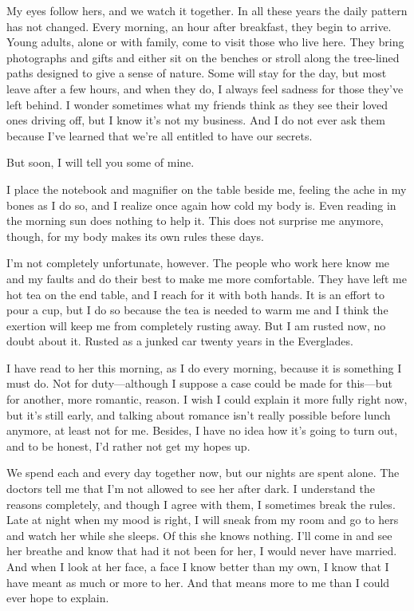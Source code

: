 \documentclass[10pt, twoside, openright]{book}
\begin{document}
My eyes follow hers, and we watch it together. In all these years the
daily pattern has not changed. Every morning, an hour after breakfast,
they begin to arrive. Young adults, alone or with family, come to visit
those who live here. They bring photographs and gifts and either sit on
the benches or stroll along the tree-lined paths designed to give a
sense of nature. Some will stay for the day, but most leave after a few
hours, and when they do, I always feel sadness for those they've left
behind. I wonder sometimes what my friends think as they see their loved
ones driving off, but I know it's not my business. And I do not ever ask
them because I've learned that we're all entitled to have our secrets.


But soon, I will tell you some of mine.


I place the notebook and magnifier on the table beside me, feeling the
ache in my bones as I do so, and I realize once again how cold my body
is. Even reading in the morning sun does nothing to help it. This does
not surprise me anymore, though, for my body makes its own rules these
days.

I'm not completely unfortunate, however. The people who work here know
me and my faults and do their best to make me more comfortable. They
have left me hot tea on the end table, and I reach for it with both
hands. It is an effort to pour a cup, but I do so because the tea is
needed to warm me and I think the exertion will keep me from completely
rusting away. But I am rusted now, no doubt about it. Rusted as a junked
car twenty years in the Everglades.

I have read to her this morning, as I do every morning, because it is
something I must do. Not for duty---although I suppose a case could be
made for this---but for another, more romantic, reason. I wish I could
explain it more fully right now, but it's still early, and talking about
romance isn't really possible before lunch anymore, at least not for me.
Besides, I have no idea how it's going to turn out, and to be honest,
I'd rather not get my hopes up.

We spend each and every day together now, but our nights are spent
alone. The doctors tell me that I'm not allowed to see her after dark. I
understand the reasons completely, and though I agree with them, I
sometimes break the rules. Late at night when my mood is right, I will
sneak from my room and go to hers and watch her while she sleeps. Of
this she knows nothing. I'll come in and see her breathe and know that
had it not been for her, I would never have married. And when I look at
her face, a face I know better than my own, I know that I have meant as
much or more to her. And that means more to me than I could ever hope to
explain.
\end{document}
